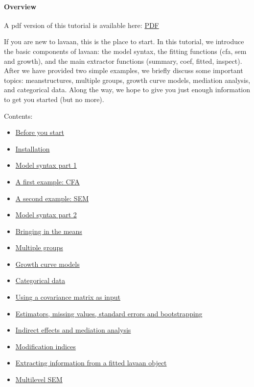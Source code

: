 \hypertarget{overview}{%
\paragraph{Overview}\label{overview}}

A pdf version of this tutorial is available here:
\href{/tutorial/tutorial.pdf}{PDF}

If you are new to lavaan, this is the place to start. In this tutorial,
we introduce the basic components of lavaan: the model syntax, the
fitting functions (cfa, sem and growth), and the main extractor
functions (summary, coef, fitted, inspect). After we have provided two
simple examples, we briefly discuss some important topics:
meanstructures, multiple groups, growth curve models, mediation
analysis, and categorical data. Along the way, we hope to give you just
enough information to get you started (but no more).

Contents:

\begin{itemize}
\tightlist
\item
  \href{/tutorial/before.html}{Before you start}
\item
  \href{/tutorial/install.html}{Installation}
\item
  \href{/tutorial/syntax1.html}{Model syntax part 1}
\item
  \href{/tutorial/cfa.html}{A first example: CFA}
\item
  \href{/tutorial/sem.html}{A second example: SEM}
\item
  \href{/tutorial/syntax2.html}{Model syntax part 2}
\item
  \href{/tutorial/means.html}{Bringing in the means}
\item
  \href{/tutorial/groups.html}{Multiple groups}
\item
  \href{/tutorial/growth.html}{Growth curve models}
\item
  \href{/tutorial/cat.html}{Categorical data}
\item
  \href{/tutorial/cov.html}{Using a covariance matrix as input}
\item
  \href{/tutorial/est.html}{Estimators, missing values, standard errors
  and bootstrapping}
\item
  \href{/tutorial/mediation.html}{Indirect effects and mediation
  analysis}
\item
  \href{/tutorial/modindices.html}{Modification indices}
\item
  \href{/tutorial/inspect.html}{Extracting information from a fitted
  lavaan object}
\item
  \href{/tutorial/multilevel.html}{Multilevel SEM}
\end{itemize}
